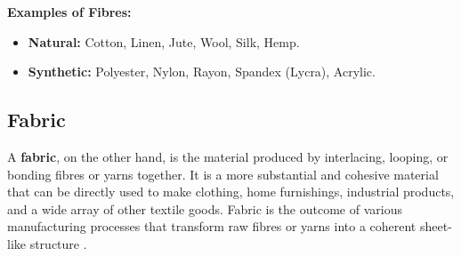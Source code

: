 \textbf{Examples of Fibres:}
\begin{itemize}
    \item \textbf{Natural:} Cotton, Linen, Jute, Wool, Silk, Hemp.
    \item \textbf{Synthetic:} Polyester, Nylon, Rayon, Spandex (Lycra), Acrylic.
\end{itemize}

\subsection{Fabric}

A \textbf{fabric}, on the other hand, is the material produced by interlacing, looping, or bonding fibres or yarns together. It is a more substantial and cohesive material that can be directly used to make clothing, home furnishings, industrial products, and a wide array of other textile goods. Fabric is the outcome of various manufacturing processes that transform raw fibres or yarns into a coherent sheet-like structure \cite{researchgate, hong2024research}.

